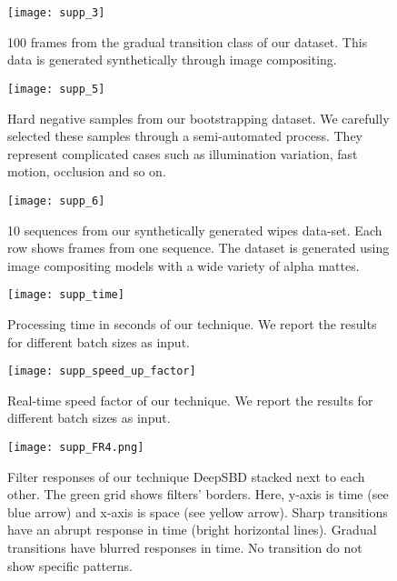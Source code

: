 \documentclass[journal]{IEEEtran}
\begin{document}
\begin{figure*}[!t]


\texttt{[image: supp\_3]}

\centering
\caption{100 frames from the gradual transition class of our dataset. This data is generated synthetically through image compositing.}
\label{Mosaic_gradual}

\end{figure*}



\begin{figure*}[!t]


\texttt{[image: supp\_5]}

\centering
\caption{Hard negative samples from our bootstrapping dataset. We carefully selected these samples through a semi-automated process. They represent complicated cases such as illumination variation, fast motion, occlusion and so on.}
\label{Mosaic_BT}

\end{figure*}

\begin{figure*}[t]


\texttt{[image: supp\_6]}

\centering

\caption{10 sequences from our synthetically generated wipes data-set. Each row shows frames from one sequence. The dataset is generated using image compositing models with a wide variety of alpha mattes.}
\label{mosaic_wipe}
\end{figure*}


\begin{figure}[t]


\texttt{[image: supp\_time]}

\centering

\caption{Processing time in seconds of our technique. We report the results for different batch sizes as input.}
\label{PT_secs}
\end{figure}

\begin{figure}[t]


\texttt{[image: supp\_speed\_up\_factor]}

\centering

\caption{Real-time speed factor of our technique. We report the results for different batch sizes as input.}
\label{SUF}
\end{figure}







\begin{figure*}[t]
  \centering  
   \texttt{[image: supp\_FR4.png]}
  \caption{Filter responses of our technique DeepSBD stacked next to each other. The green grid shows filters' borders. Here, y-axis is time (see blue arrow) and x-axis is space (see yellow arrow). Sharp transitions have an abrupt response in time (bright horizontal lines). Gradual transitions have blurred responses in time. No transition do not show specific patterns.}
  \label{fig:FR}
\end{figure*}
\end{document}
